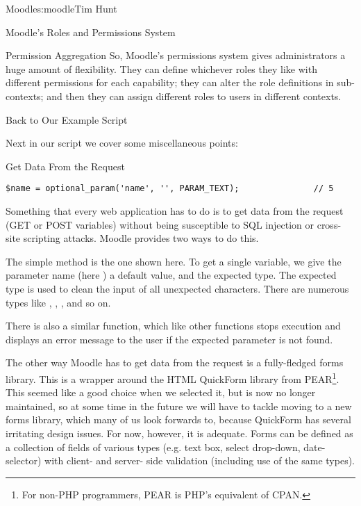 \begin{aosachapter}{Moodle}{s:moodle}{Tim Hunt}
\begin{aosasect1}{Moodle's Roles and Permissions System}
\begin{aosasect2}{Permission Aggregation}
So, Moodle's permissions system gives administrators a huge amount of
flexibility. They can define whichever roles they like with different
permissions for each capability; they can alter the role definitions
in sub-contexts; and then they can assign different roles to users in
different contexts.

\end{aosasect2}

\end{aosasect1}

\begin{aosasect1}{Back to Our Example Script}

Next in our script we cover some miscellaneous points:

\begin{aosasect2}{Get Data From the Request}

\begin{verbatim}
$name = optional_param('name', '', PARAM_TEXT);               // 5
\end{verbatim}

Something that every web application has to do is to get data from the
request (GET or POST variables) without being susceptible to SQL
injection or cross-site scripting attacks. Moodle provides two ways to
do this.

The simple method is the one shown here. To get a single variable, we
give the parameter name (here ) a default value, and the
expected type. The expected type is used to clean the input of all
unexpected characters. There are numerous types like
, , , and so
on.

There is also a similar  function, which like
other  functions stops execution and displays
an error message to the user if the expected parameter is not found.

The other way Moodle has to get data from the request is a
fully-fledged forms library. This is a wrapper around the HTML
QuickForm library from PEAR\footnote{For non-PHP programmers, PEAR is
  PHP's equivalent of CPAN.}. This seemed like a good choice when we
selected it, but is now no longer maintained, so at some time in the
future we will have to tackle moving to a new forms library, which
many of us look forwards to, because QuickForm has several irritating
design issues. For now, however, it is adequate. Forms can be defined
as a collection of fields of various types (e.g. text box, select
drop-down, date-selector) with client- and server- side validation
(including use of the same  types).


\end{aosasect2}
\end{aosasect1}
\end{aosachapter}
